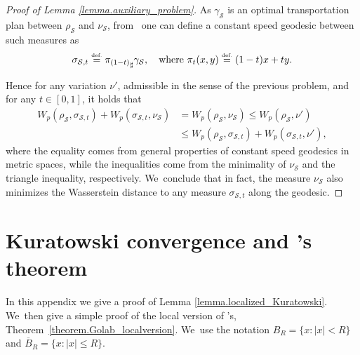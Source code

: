 \documentclass[10pt]{amsart}
\theoremstyle{definition}
\newcommand{\eqdef}{\ensuremath{\stackrel{\mbox{\upshape\tiny def.}}{=}}}
\newcommand{\oB}{\overline{B}}
\begin{document}
\begin{proof}[Proof of Lemma \ref{lemma.auxiliary_problem}]
As $\gamma_{\mathcal{S}}$ is an optimal transportation plan between $\rho_{\mathcal{S}}$ and $\nu_{\mathcal{S}}$, from~\cite[Th.\,5.27]{santambrogio2015optimal} one can define a constant speed geodesic between such measures as
\begin{equation*}
\sigma_{\mathcal{S},t} \eqdef {\pi_{(1-t)}}_\sharp\gamma_{\mathcal{S}}, \quad\text{where } \pi_t(x,y) \eqdef (1-t)x + ty.
\end{equation*}

Hence for any variation $\nu'$, admissible in the sense of the previous problem, and for any $t \in [0,1]$, it holds that
\begin{align*}
W_p\left(\rho_{\mathcal{S}}, \sigma_{\mathcal{S},t}\right) + W_p\left(\sigma_{\mathcal{S},t}, \nu_{\mathcal{S}}\right)
&=
W_p\left(\rho_{\mathcal{S}}, \nu_{\mathcal{S}}\right)
\le W_p\left(\rho_{\mathcal{S}}, \nu'\right)\\
&\le W_p\left(\rho_{\mathcal{S}}, \sigma_{\mathcal{S},t}\right) + W_p(\sigma_{\mathcal{S},t}, \nu'),
\end{align*}
where the equality comes from general properties of constant speed geodesics in metric spaces, while the inequalities come from the minimality of $\nu_{\mathcal{S}}$ and the triangle inequality, respectively. We~conclude that in fact, the measure $\nu_{\mathcal{S}}$ also minimizes the Wasserstein distance to any measure $\sigma_{\mathcal{S},t}$ along the geodesic.
\end{proof}

\section{Kuratowski convergence and \Golab's theorem}\label{appendix.kuratowski_convergence}
In this appendix we give a proof of Lemma \ref{lemma.localized_Kuratowski}. We~then give a simple proof
of the local version of \Golab's, Theorem~\ref{theorem.Golab_localversion}. We~use the notation $B_R=\{x: |x|<R\}$ and $\oB_R = \{x:|x|\le R\}$.
\end{document}
